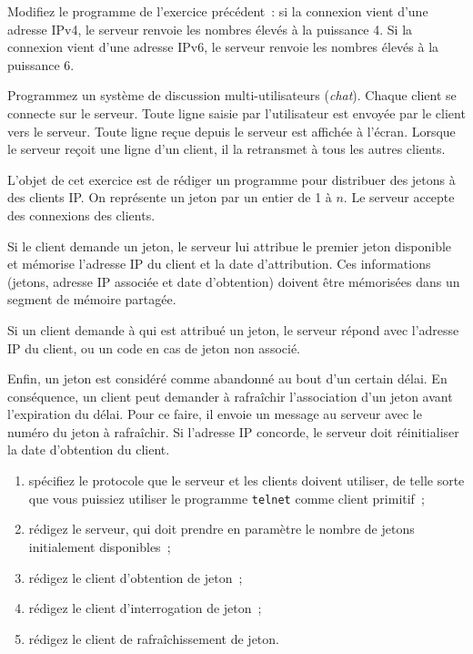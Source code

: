 \question

Modifiez le programme de l'exercice précédent~: si la connexion
vient d'une adresse IPv4, le serveur renvoie les nombres élevés à
la puissance 4. Si la connexion vient d'une adresse IPv6, le serveur
renvoie les nombres élevés à la puissance 6.


\question

Programmez un système de discussion multi-utilisateurs (\textit
{chat\/}). Chaque client se connecte sur le serveur. Toute ligne
saisie par l'utilisateur est envoyée par le client vers le serveur.
Toute ligne reçue depuis le serveur est affichée à l'écran. Lorsque
le serveur reçoit une ligne d'un client, il la retransmet à tous
les autres clients.


\question

L'objet de cet exercice est de rédiger un programme pour distribuer
des jetons à des clients IP. On représente un jeton par un entier
de 1 à $n$. Le serveur accepte des connexions des clients.

Si le client demande un jeton, le serveur lui attribue le premier
jeton disponible et mémorise l'adresse IP du client et la date
d'attribution. Ces informations (jetons, adresse IP associée et
date d'obtention) doivent être mémorisées dans un segment de mémoire
partagée.

Si un client demande à qui est attribué un jeton, le serveur répond
avec l'adresse IP du client, ou un code en cas de jeton non associé.

Enfin, un jeton est considéré comme abandonné au bout d'un certain
délai. En conséquence, un client peut demander à rafraîchir
l'association d'un jeton avant l'expiration du délai. Pour ce faire,
il envoie un message au serveur avec le numéro du jeton à rafraîchir.
Si l'adresse IP concorde, le serveur doit réinitialiser la date
d'obtention du client.

\begin {enumerate}
    \item spécifiez le protocole que le serveur et les clients doivent
	utiliser, de telle sorte que vous puissiez utiliser le programme
	\texttt {telnet} comme client primitif~;
    \item rédigez le serveur, qui doit prendre en paramètre le
	nombre de jetons initialement disponibles~;
    \item rédigez le client d'obtention de jeton~;
    \item rédigez le client d'interrogation de jeton~;
    \item rédigez le client de rafraîchissement de jeton.
\end {enumerate}
